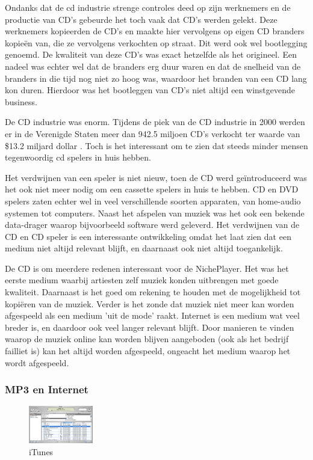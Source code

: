 Ondanks dat de cd industrie strenge controles deed op zijn werknemers en de productie van CD's gebeurde het toch vaak dat CD's werden gelekt. Deze werknemers kopieerden de CD's en maakte hier vervolgens op eigen CD branders kopieën van, die ze vervolgens verkochten op straat. Dit werd ook wel bootlegging genoemd. De kwaliteit van deze CD's was exact hetzelfde als het origineel. Een nadeel was echter wel dat de branders erg duur waren en dat de snelheid van de branders in die tijd nog niet zo hoog was, waardoor het branden van een CD lang kon duren. Hierdoor was het bootleggen van CD's niet altijd een winstgevende business.

De CD industrie was enorm. Tijdens de piek van de CD industrie in 2000 werden er in de Verenigde Staten meer dan 942.5 miljoen CD's verkocht ter waarde van \$13.2 miljard dollar \citep{riaa2022salesdatabase}. Toch is het interessant om te zien dat steeds minder mensen tegenwoordig cd spelers in huis hebben.

Het verdwijnen van een speler is niet nieuw, toen de CD werd geïntroduceerd was het ook niet meer nodig om een cassette spelers in huis te hebben. CD en DVD spelers zaten echter wel in veel verschillende soorten apparaten, van home-audio systemen tot computers. Naast het afspelen van muziek was het ook een bekende data-drager waarop bijvoorbeeld software werd geleverd. Het verdwijnen van de CD en CD speler is een interessante ontwikkeling omdat het laat zien dat een medium niet altijd relevant blijft, en daarnaast ook niet altijd toegankelijk.

De CD is om meerdere redenen interessant voor de NichePlayer. Het was het eerste medium waarbij artiesten zelf muziek konden uitbrengen met goede kwaliteit. Daarnaast is het goed om rekening te houden met de mogelijkheid tot kopiëren van de muziek. Verder is het zonde dat muziek niet meer kan worden afgespeeld als een medium 'uit de mode' raakt. Internet is een medium wat veel breder is, en daardoor ook veel langer relevant blijft. Door manieren te vinden waarop de muziek online kan worden blijven aangeboden (ook als het bedrijf failliet is) kan het altijd worden afgespeeld, ongeacht het medium waarop het wordt afgespeeld.

\subsubsection*{MP3 en Internet}
\begin{figure}
    \centering
    \includegraphics[width=0.25\textwidth]{assets/critical-review/iTunes_v1.jpeg}
    \caption{iTunes}
    \label{fig:critical-review:iTunes}
\end{figure}


